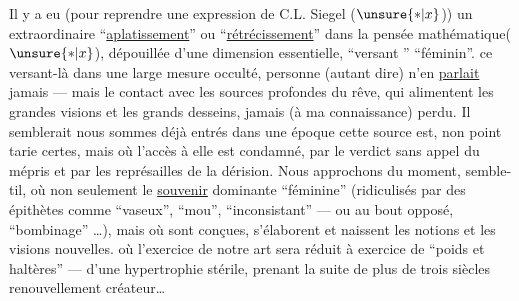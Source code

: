 Il y a eu  (pour reprendre  une expression de C.L. Siegel
($\unsure{*|x}$)) un extraordinaire ``\uline{aplatissement}'' ou ``\uline{rétrécissement}''
dans la pensée mathématique($\unsure{*|x}$), dépouillée d'une dimension essentielle,
``versant ''  ``féminin''.
ce versant-là  dans une large mesure occulté,
 personne (autant dire) n'en \uline{parlait} jamais
--- mais le contact avec les sources profondes du rêve, qui alimentent
 les grandes visions et les grands desseins,
 jamais (à ma connaissance)
 perdu. Il semblerait 
nous sommes déjà entrés dans une époque
cette source est, non point tarie certes, mais où l'accès à elle est condamné,
par le verdict sans appel  du mépris
 et par les représailles de la dérision.
Nous approchons du moment, semble-til, où
non seulement le \uline{souvenir}
 dominante ``féminine''
(ridiculisés par des épithètes comme ``vaseux'', ``mou'', ``inconsistant'' --- ou au bout opposé,
``bombinage''  \ldots), mais
où sont conçues, s'élaborent et naissent les notions et les visions nouvelles.
où l'exercice de notre art sera réduit à 
 exercice de ``poids et haltères''
---  d'une hypertrophie stérile,
prenant la suite de plus de trois siècles  renouvellement créateur\ldots
{}

